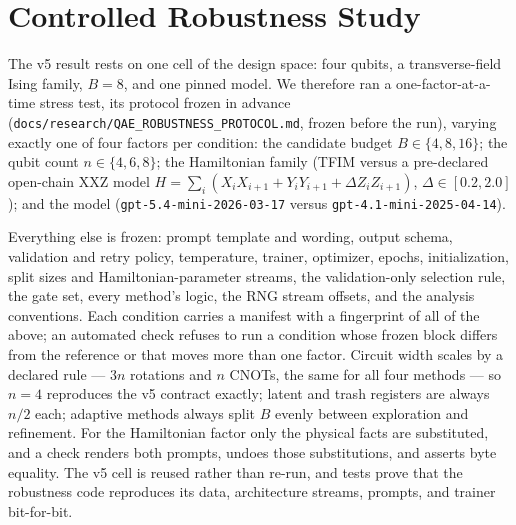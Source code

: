 \documentclass[11pt]{article}
\begin{document}
\section{Controlled Robustness Study}
\label{sec:robustness}

The v5 result rests on one cell of the design space: four qubits, a
transverse-field Ising family, $B=8$, and one pinned model.
We therefore ran a one-factor-at-a-time stress test, its protocol frozen in advance
(\texttt{docs/research/QAE\_ROBUSTNESS\_PROTOCOL.md}, frozen before the run),
varying exactly one of four factors per condition:
the candidate budget $B \in \{4,8,16\}$;
the qubit count $n \in \{4,6,8\}$;
the Hamiltonian family (TFIM versus a pre-declared open-chain XXZ model
$H=\sum_i (X_iX_{i+1}+Y_iY_{i+1}+\Delta Z_iZ_{i+1})$, $\Delta \in [0.2,2.0]$);
and the model (\texttt{gpt-5.4-mini-2026-03-17} versus
\texttt{gpt-4.1-mini-2025-04-14}).

Everything else is frozen: prompt template and wording, output schema,
validation and retry policy, temperature, trainer, optimizer, epochs,
initialization, split sizes and Hamiltonian-parameter streams, the
validation-only selection rule, the gate set, every method's logic, the RNG
stream offsets, and the analysis conventions.
Each condition carries a manifest with a fingerprint of all of the above; an
automated check refuses to run a condition whose frozen block differs from the
reference or that moves more than one factor.
Circuit width scales by a declared rule --- $3n$ rotations and $n$ CNOTs, the
same for all four methods --- so $n=4$ reproduces the v5 contract exactly;
latent and trash registers are always $n/2$ each; adaptive methods always split
$B$ evenly between exploration and refinement.
For the Hamiltonian factor only the physical facts are substituted, and a
check renders both prompts, undoes those substitutions, and asserts byte
equality.
The v5 cell is reused rather than re-run, and tests prove that the robustness
code reproduces its data, architecture streams, prompts, and trainer
bit-for-bit.
\end{document}
